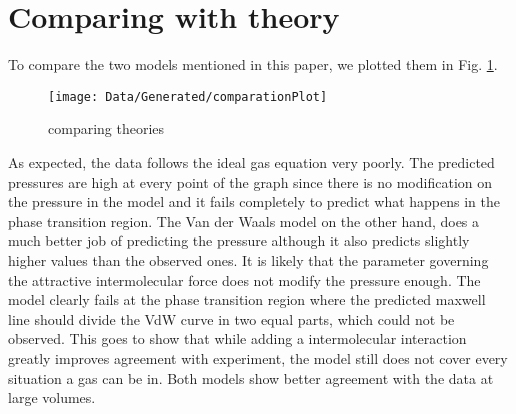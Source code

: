 \documentclass[a4paper,10pt,twocolumn]{article}
\begin{document}
    \section{Comparing with theory}\label{sec:comaringTheory}
    To compare the two models mentioned in this paper, we plotted them in Fig.  \ref{fig:comparingTheories}.
    \begin{figure}
        \begin{center}
            \texttt{[image: Data/Generated/comparationPlot]}
            \caption[]{comparing theories}
            \label{fig:comparingTheories}
        \end{center}
    \end{figure}
    As expected, the data follows the ideal gas equation very poorly.
    The predicted pressures are high at every point of the graph since there is no modification on the pressure in the model and it fails completely to predict what happens in the phase transition region.
    The Van der Waals model on the other hand, does a much better job of predicting the pressure although it also predicts slightly higher values than the observed ones.
    It is likely that the parameter governing the attractive intermolecular force does not modify the pressure enough.
    The model clearly fails at the phase transition region where the predicted maxwell line should divide the VdW curve in two equal parts, which could not be observed.
    This goes to show that while adding a intermolecular interaction greatly improves agreement with experiment, the model still does not cover every situation a gas can be in.
    Both models show better agreement with the data at large volumes.
\end{document}
